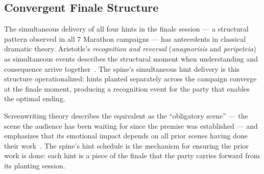 \subsection{Convergent Finale Structure}

The simultaneous delivery of all four hints in the finale session --- a structural
pattern observed in all 7 Marathon campaigns --- has antecedents in classical
dramatic theory. Aristotle's \textit{recognition and reversal} (\textit{anagnorisis}
and \textit{peripeteia}) as simultaneous events describes the structural moment
when understanding and consequence arrive together~\cite{aristotle1996}. The spine's
simultaneous hint delivery is this structure operationalized: hints planted
separately across the campaign converge at the finale moment, producing a
recognition event for the party that enables the optimal ending.

Screenwriting theory describes the equivalent as the ``obligatory scene'' ---
the scene the audience has been waiting for since the premise was established ---
and emphasizes that its emotional impact depends on all prior scenes having done
their work~\cite{field2005}. The spine's hint schedule is the mechanism for
ensuring the prior work is done: each hint is a piece of the finale that the
party carries forward from its planting session.
